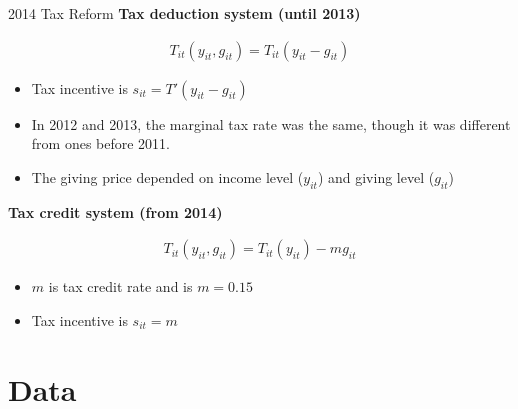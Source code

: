 \documentclass[
  ignorenonframetext,
  aspectratio=169,
]{beamer}
\providecommand{\tightlist}{%
  \setlength{\itemsep}{0pt}\setlength{\parskip}{0pt}}
\begin{document}
\begin{frame}{2014 Tax Reform}
\protect\hypertarget{tax-reform-1}{}
\textbf{Tax deduction system (until 2013)}

\begin{align}
  T_{it}(y_{it}, g_{it}) = T_{it}(y_{it} - g_{it})
\end{align}

\begin{itemize}
\tightlist
\item
  Tax incentive is \(s_{it} = T'(y_{it} - g_{it})\)
\item
  In 2012 and 2013, the marginal tax rate was the same, though it was different from ones before 2011.
\item
  The giving price depended on income level (\(y_{it}\)) and giving level (\(g_{it}\))
\end{itemize}

\textbf{Tax credit system (from 2014)}

\begin{align}
  T_{it}(y_{it}, g_{it}) = T_{it}(y_{it}) - m g_{it}
\end{align}

\begin{itemize}
\tightlist
\item
  \(m\) is tax credit rate and is \(m = 0.15\)
\item
  Tax incentive is \(s_{it} = m\)
\end{itemize}
\end{frame}

\hypertarget{data}{%
\section{Data}\label{data}}
\end{document}
